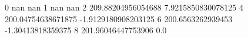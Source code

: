 0 nan nan
1 nan nan
2 209.88204956054688 7.9215850830078125
4 200.04754638671875 -1.9129180908203125
6 200.6563262939453 -1.30413818359375
8 201.96046447753906 0.0
